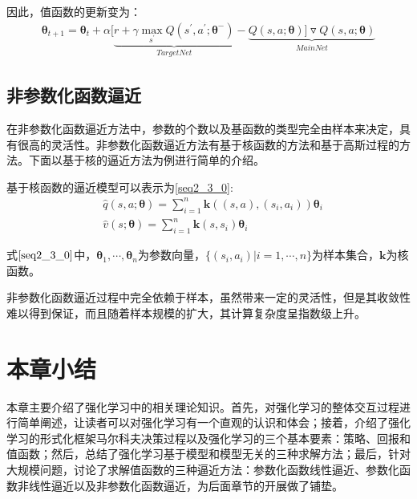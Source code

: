因此，值函数的更新变为：
\begin{equation}
\begin{aligned}
\bm{\theta}_{t+1}=\bm{\theta}_{t}+\alpha[\underbrace{r+\gamma \max_{s^{'}}Q(s^{'},a^{'};\bm{\theta}^{-})}_{TargetNet}-\underbrace{Q(s,a;\bm{\theta})]\triangledown Q(s,a;\bm{\theta})}_{MainNet}
\end{aligned}
\end{equation}

\subsection{非参数化函数逼近}
在非参数化函数逼近方法中，参数的个数以及基函数的类型完全由样本来决定，具有很高的灵活性。非参数化函数逼近方法有基于核函数的方法和基于高斯过程的方法。下面以基于核的逼近方法为例进行简单的介绍。

基于核函数的逼近模型可以表示为\eqref{seq2_3_0}:
\begin{equation}\label{seq2_3_0}
\begin{aligned}
&\hat{q}(s,a;\bm{\theta})=\sum^{n}_{i=1}\bm{k}((s,a),(s_{i},a_{i}))\bm{\theta}_{i}\\
&\hat{v}(s;\bm{\theta})=\sum^{n}_{i=1}\bm{k}(s,s_{i})\bm{\theta}_{i}
\end{aligned}
\end{equation}

式$\eqref{seq2_3_0}$中，$\bm{\theta}_{1},\cdots,\bm{\theta}_{n}$为参数向量，$\{(s_{i},a_{i})|i=1,\cdots,n\}$为样本集合，$\bm{k}$为核函数。

非参数化函数逼近过程中完全依赖于样本，虽然带来一定的灵活性，但是其收敛性难以得到保证，而且随着样本规模的扩大，其计算复杂度呈指数级上升。

\section{本章小结}
 本章主要介绍了强化学习中的相关理论知识。首先，对强化学习的整体交互过程进行简单阐述，让读者可以对强化学习有一个直观的认识和体会；接着，介绍了强化学习的形式化框架马尔科夫决策过程以及强化学习的三个基本要素：策略、回报和值函数；然后，总结了强化学习基于模型和模型无关的三种求解方法；最后，针对大规模问题，讨论了求解值函数的三种逼近方法：参数化函数线性逼近、参数化函数非线性逼近以及非参数化函数逼近，为后面章节的开展做了铺垫。
 \cleardoublepage